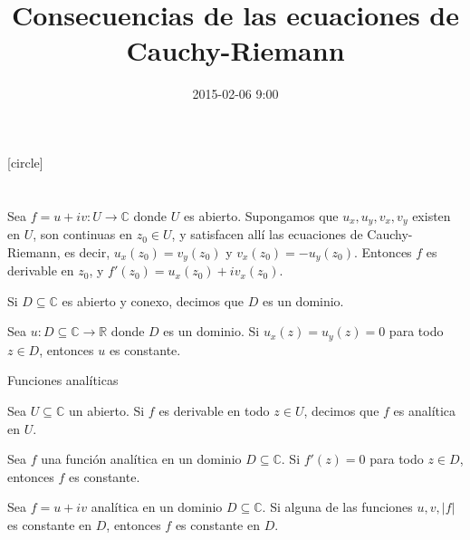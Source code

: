 \documentclass[spanish,presentation]{beamer}
\date{2015-02-06 9:00}
\title{Consecuencias de las ecuaciones de Cauchy-Riemann}
\begin{document}
\maketitle
{}
[circle]

\tableofcontents

\section{}
\label{sec-1}

\begin{frame}[label=sec-1-1]{}
\begin{theorem}
Sea \(f=u+iv\colon U\to \mathbb{C}\) donde \(U\) es
abierto. Supongamos que \(u_{x},u_{y},v_{x},v_{y}\) existen en
\(U\), son continuas en \(z_{0}\in U\), y satisfacen allí las
ecuaciones de Cauchy-Riemann, es decir,
\(u_{x}(z_{0})=v_{y}(z_{0})\) y
\(v_{x}(z_{0})=-u_{y}(z_{0})\). Entonces \(f\) es derivable en
\(z_{0}\), y \(f'(z_{0})=u_{x}(z_{0})+iv_{x}(z_{0})\).
\end{theorem}
\end{frame}

\begin{frame}[label=sec-1-2]{}
\begin{definition}
Si \(D\subseteq \mathbb{C}\) es abierto y conexo, decimos que
\(D\) es un \alert{dominio}.
\end{definition}

\begin{lemma}
Sea \(u\colon D\subseteq \mathbb{C}\to \mathbb{R}\) donde \(D\) es
un dominio. Si \(u_{x}(z)=u_{y}(z)=0\) para todo \(z\in D\),
entonces \(u\) es constante.
\end{lemma}
\end{frame}

\begin{frame}[label=sec-1-3]{Funciones analíticas}
\begin{definition}
Sea \(U\subseteq \mathbb{C}\) un abierto. Si \(f\) es derivable en
todo \(z\in U\), decimos que \(f\) es \alert{analítica} en \(U\).
\end{definition}

\begin{theorem}
Sea \(f\) una función analítica en un dominio \(D\subseteq
    \mathbb{C}\). Si \(f'(z)=0\) para todo \(z\in D\), entonces \(f\)
es constante.
\end{theorem}

\begin{theorem}
Sea \(f=u+iv\) analítica en un dominio \(D\subseteq
    \mathbb{C}\). Si alguna de las funciones \(u,v,|f|\) es constante
en \(D\), entonces \(f\) es constante en \(D\).
\end{theorem}
\end{frame}
\end{document}
